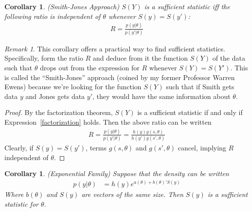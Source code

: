 \documentclass[12pt]{article}
\theoremstyle{plain}
\newtheorem{cor}[thm]{Corollary}
\theoremstyle{definition}
\theoremstyle{remark}
\newtheorem*{rmk}{Remark}
\begin{document}
\begin{cor}\emph{(Smith-Jones Approach)}
$S(Y)$ is a sufficient statistic iff the following ratio is independent
of $\theta$ whenever $S(y)=S(y')$:
\begin{align*}
  R=\frac{p(y|\theta)}{p(y'|\theta)}
\end{align*}
\end{cor}
\begin{rmk}
This corollary offers a practical way to find sufficient statistics.
Specifically, form the ratio $R$ and deduce from it the function $S(Y)$
of the data such that $\theta$ drops out from the expression for $R$
whenever $S(Y)=S(Y')$.
This is called the ``Smith-Jones'' approach (coined by my
former Professor Warren Ewens) because we're looking for the function
$S(Y)$ such that if Smith gets data $y$ and Jones gets data $y'$, they
would have the same information about $\theta$.
\end{rmk}
\begin{proof}
By the factorization theorem, $S(Y)$ is a sufficient statistic if and
only if Expression~\ref{factorization} holds. Then the above ratio can
be written
\begin{align*}
  R
  =
  \frac{p(y|\theta)}{p(y'|\theta)}
  =
  \frac{h(y)g(s,\theta)}{h(y')g(s',\theta)}
\end{align*}
Clearly, if $S(y)=S(y')$, terms $g(s,\theta)$ and $g(s',\theta)$
cancel, implying $R$ independent of $\theta$.
\end{proof}


\begin{cor}\emph{(Exponential Family)}
Suppose that the density can be written
\begin{align*}
  p(y|\theta)
  &= h(y) e^{a(\theta) + b(\theta)' S(y)}
\end{align*}
Where $b(\theta)$ and $S(y)$ are vectors of the same size.
Then $S(y)$ is a sufficient statistic for $\theta$.
\end{cor}





\end{document}
